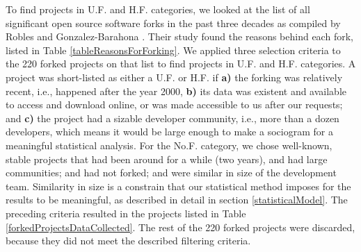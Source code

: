 \documentclass[12pt]{report}
\begin{document}
To find projects in U.F. and H.F. categories, we looked at the list of all significant open source software forks in the past three decades as compiled by Robles and Gonzalez-Barahona \cite{Robles}. Their study found the reasons behind each fork, listed in Table \ref{tableReasonsForForking}. We applied three selection criteria to the 220 forked projects on that list to find projects in U.F. and H.F. categories. A project was short-listed as either a U.F. or H.F. if \textbf{a)} the forking was relatively recent, i.e., happened after the year 2000, \textbf{b)} its data was existent and available to access and download online, or was made accessible to us after our requests; and \textbf{c)} the project had a sizable developer community, i.e., more than a dozen developers, which means it would be large enough to make a sociogram for a meaningful statistical analysis. For the No.F. category, we chose well-known, stable projects that had been around for a while (two years), and had large communities; and had not forked; and were similar in size of the development team. Similarity in size is a constrain that our statistical method imposes for the results to be meaningful, as described in detail in section \ref{statisticalModel}.  The preceding criteria resulted in the projects listed in Table \ref{forkedProjectsDataCollected}. The rest of the 220 forked projects were discarded, because they did not meet the described filtering criteria.
\end{document}

